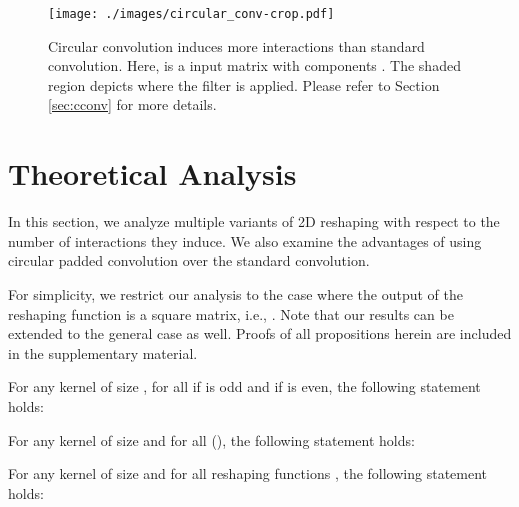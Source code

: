 \documentclass[11pt,a4paper]{article}
\begin{document}
\begin{figure}[t]
	\centering
	\texttt{[image: ./images/circular\_conv-crop.pdf]}
	\caption{\label{fig:circ_conv} Circular convolution induces more interactions than standard convolution. Here,  is a  input matrix with components . The shaded region depicts where the filter is applied. Please refer to Section \ref{sec:cconv} for more details.
	}
\end{figure} \section{Theoretical Analysis}
\label{sec:theory}

In this section, we analyze multiple variants of 2D reshaping with respect to the number of interactions they induce. We also examine the advantages of using circular padded convolution over the standard convolution. 

For simplicity, we restrict our analysis to the case where the output of the reshaping function is a square matrix, i.e., . Note that our results can be extended to the general case as well. Proofs of all propositions herein are included in the supplementary material. 

\begin{proposition}
	\label{thm:cat_alt_comp}
	For any kernel  of size , for all  if  is odd and  if  is even, the following statement holds:

\end{proposition}


\begin{proposition}
	\label{thm:alt_tau_comp}
	For any kernel  of size  and for all  (), the following statement holds:

\end{proposition}


\begin{proposition}
	\label{thm:max_best}
	For any kernel  of size  and for all reshaping functions , the following statement holds:

\end{proposition}
\end{document}
